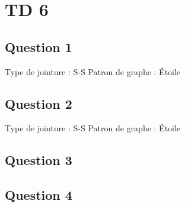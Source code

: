 \section{TD 6}
\subsection{Question 1}
%
%
%
Type de jointure : S-S Patron de graphe : Étoile
\subsection{Question 2}
Type de jointure : S-S Patron de graphe : Étoile
\subsection{Question 3}
\subsection{Question 4}

